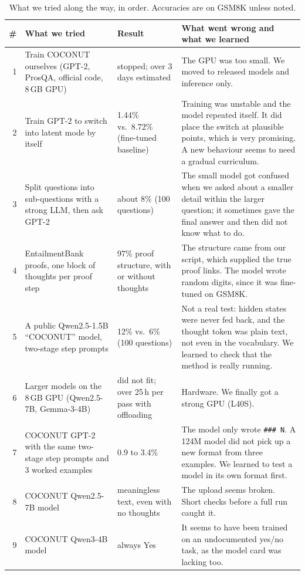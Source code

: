 \documentclass[10pt,letterpaper]{article}
\newcommand{\step}[1]{\texttt{\small #1}}
\begin{document}
\begin{table}[!t]
\begin{center}
\caption{What we tried along the way, in order. Accuracies are on GSM8K unless noted.}
\label{tab:attempts}
\vskip 0.08in
\footnotesize
\begin{tabular}{rp{4.6cm}p{3.3cm}p{8.0cm}}
\toprule
\# & What we tried & Result & What went wrong and what we learned \\
\midrule
1 & Train COCONUT ourselves (GPT-2, ProsQA, official code, 8\,GB GPU) & stopped; over 3 days estimated & The GPU was too small. We moved to released models and inference only. \\
2 & Train GPT-2 to switch into latent mode by itself & 1.44\% vs.\ 8.72\% (fine-tuned baseline) & Training was unstable and the model repeated itself. It did place the switch at plausible points, which is very promising. A new behaviour seems to need a gradual curriculum. \\
3 & Split questions into sub-questions with a strong LLM, then ask GPT-2 & about 8\% (100 questions) & The small model got confused when we asked about a smaller detail within the larger question; it sometimes gave the final answer and then did not know what to do. \\
4 & EntailmentBank proofs, one block of thoughts per proof step & 97\% proof structure, with or without thoughts & The structure came from our script, which supplied the true proof links. The model wrote random digits, since it was fine-tuned on GSM8K. \\
5 & A public Qwen2.5-1.5B ``COCONUT'' model, two-stage step prompts & 12\% vs.\ 6\% (100 questions) & Not a real test: hidden states were never fed back, and the thought token was plain text, not even in the vocabulary. We learned to check that the method is really running. \\
6 & Larger models on the 8\,GB GPU (Qwen2.5-7B, Gemma-3-4B) & did not fit; over 25\,h per pass with offloading & Hardware. We finally got a strong GPU (L40S). \\
7 & COCONUT GPT-2 with the same two-stage step prompts and 3 worked examples & 0.9 to 3.4\% & The model only wrote \step{\#\#\# N}. A 124M model did not pick up a new format from three examples. We learned to test a model in its own format first. \\
8 & COCONUT Qwen2.5-7B model & meaningless text, even with no thoughts & The upload seems broken. Short checks before a full run caught it. \\
9 & COCONUT Qwen3-4B model & always Yes & It seems to have been trained on an undocumented yes/no task, as the model card was lacking too. \\

\end{tabular}
\end{center}
\end{table}
\end{document}
